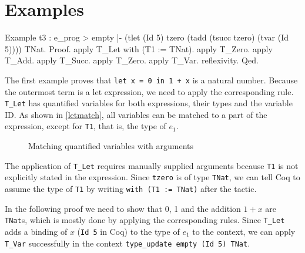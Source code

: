 \documentclass[paper = a4, fleqn, abstract=on, twoside]{scrreprt}
\newcommand{\coqinline}[1]{\texttt{#1}}
\begin{document}
\section{Examples}
\begin{coqcode}
Example t3 : e_prog > empty |- (tlet (Id 5) tzero 
                                     (tadd (tsucc tzero) 
                                           (tvar (Id 5)))) \in TNat.
Proof. 
  apply T_Let with (T1 := TNat).
  apply T_Zero.
  apply T_Add.
  apply T_Succ. apply T_Zero.
  apply T_Var. reflexivity.
Qed.
\end{coqcode}
The first example proves that \texttt{let x = 0 in 1 + x} is a natural number. Because the outermost term is a let expression, we need to apply the corresponding rule. \coqinline{T_Let} has quantified variables for both expressions, their types and the variable ID. As shown in \autoref{letmatch}, all variables can be matched to a part of the expression, except for \coqinline{T1}, that is, the type of $e_{1}$.
\begin{figure}[H]
	\caption{Matching quantified variables with arguments}
	\label{letmatch}
\end{figure}\noindent
The application of \coqinline{T_Let} requires manually supplied arguments because \coqinline{T1} is not explicitly stated in the expression. Since \coqinline{tzero} is of type \coqinline{TNat}, we can tell Coq to assume the type of \coqinline{T1} by writing \coqinline{with (T1 := TNat)} after the tactic.
\par
In the following proof we need to show that 0, 1 and the addition $1 + x$ are \coqinline{TNat}s, which is mostly done by applying the corresponding rules. Since \coqinline{T_Let} adds a binding of $x$ (\coqinline{Id 5} in Coq) to the type of $e_{1}$ to the context, we can apply \coqinline{T_Var} successfully in the context \coqinline{type_update empty (Id 5) TNat}.\\
\end{document}
